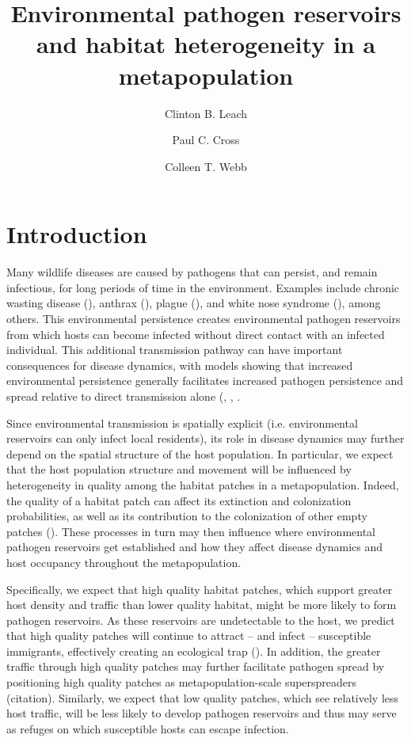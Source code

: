 \documentclass{svjour3}
\begin{document}
\title{Environmental pathogen reservoirs and habitat heterogeneity in a metapopulation}

\author{Clinton B. Leach \and Paul C. Cross \and Colleen T. Webb}




\maketitle

\section{Introduction}
\label{intro}

Many wildlife diseases are caused by pathogens that can persist, and remain infectious, for long periods of time in the environment.  Examples include chronic wasting disease (\cite{Miller2006}), anthrax (\cite{Dragon1995}), plague (\cite{Eisen2008}), and white nose syndrome (\cite{Lindner2011}), among others.  This environmental persistence creates environmental pathogen reservoirs from which hosts can become infected without direct contact with an infected individual.  This additional transmission pathway can have important consequences for disease dynamics, with models showing that increased environmental persistence generally facilitates increased pathogen persistence and spread relative to direct transmission alone (\cite{Almberg2011}, \cite{Sharp2011}, \cite{Breban2009}. 

Since environmental transmission is spatially explicit (i.e. environmental reservoirs can only infect local residents), its role in disease dynamics may further depend on the spatial structure of the host population.  In particular, we expect that the host population structure and movement will be influenced by heterogeneity in quality among the habitat patches in a metapopulation.  Indeed, the quality of a habitat patch can affect its extinction and colonization probabilities, as well as its contribution to the colonization of other empty patches (\cite{Moilanen1998}).  These processes in turn may then influence where environmental pathogen reservoirs get established and how they affect disease dynamics and host occupancy throughout the metapopulation.  

Specifically, we expect that high quality habitat patches, which support greater host density and traffic than lower quality habitat, might be more likely to form pathogen reservoirs.  As these reservoirs are undetectable to the host, we predict that high quality patches will continue to attract -- and infect -- susceptible immigrants, effectively creating an ecological trap (\cite{Almberg2011}).  In addition, the greater traffic through high quality patches may further facilitate pathogen spread by positioning high quality patches as metapopulation-scale superspreaders (citation).  Similarly, we expect that low quality patches, which see relatively less host traffic, will be less likely to develop pathogen reservoirs and thus may serve as refuges on which susceptible hosts can escape infection.  
\end{document}
